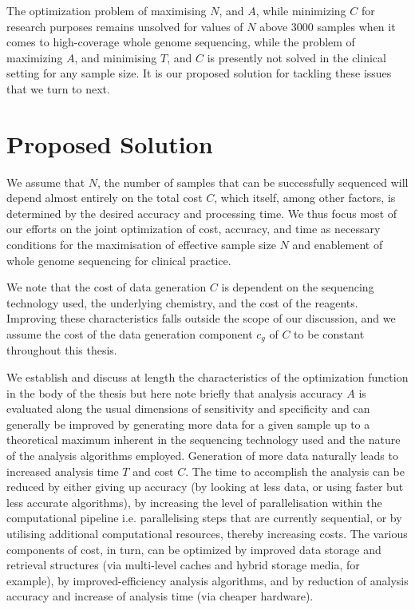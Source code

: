 The optimization problem of maximising $N$, and $A$, while minimizing $C$ for research purposes remains unsolved for values of $N$ above 3000 samples when it comes to high-coverage whole genome sequencing, while the problem of maximizing $A$, and minimising $T$, and $C$ is presently not solved in the clinical setting for any sample size. It is our proposed solution for tackling these issues that we turn to next.

\section{Proposed Solution} 

We assume that $N$, the number of samples that can be successfully sequenced will depend almost entirely on the total cost $C$, which itself, among other factors, is determined by the desired accuracy and processing time. We thus focus most of our efforts on the joint optimization of cost, accuracy, and time as necessary conditions for the maximisation of effective sample size $N$ and enablement of whole genome sequencing for clinical practice. 

We note that the cost of data generation $C$ is dependent on the sequencing technology used, the underlying chemistry, and the cost of the reagents\autocite{mohinudeen2017overview}. Improving these characteristics falls outside the scope of our discussion, and we assume the cost of the data generation component $c_{g}$ of $C$ to be constant throughout this thesis.

We establish and discuss at length the characteristics of the optimization function in the body of the thesis but here note briefly that analysis accuracy $A$ is evaluated along the usual dimensions of sensitivity and specificity and can generally be improved by generating more data for a given sample up to a theoretical maximum inherent in the sequencing technology used and the nature of the analysis algorithms employed. Generation of more data naturally leads to increased analysis time $T$ and cost $C$. The time to accomplish the analysis can be reduced by either giving up accuracy (by looking at less data, or using faster but less accurate algorithms\autocite{li2010survey}), by increasing the level of parallelisation within the computational pipeline i.e. parallelising steps that are currently sequential\autocite{langmead2012fast}, or by utilising additional computational resources, thereby increasing costs. The various components of cost, in turn, can be optimized by improved data storage and retrieval structures\autocite{papadopoulos2016tiledb} (via multi-level caches and hybrid storage media, for example), by improved-efficiency analysis algorithms, and by reduction of analysis accuracy and increase of analysis time (via cheaper hardware).

